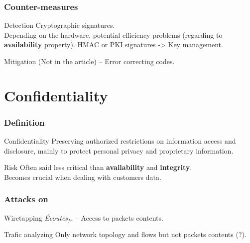 \documentclass{beamer}
\begin{document}
\begin{frame}
    \frametitle{Counter-measures}

    \begin{block}{Detection}
        Cryptographic signatures.\\
        \medskip
        Depending on the hardware, potential efficiency problems (regarding to {\bf availability} property).
        HMAC or PKI signatures -> Key management.
    \end{block}
    \vfill
    \begin{block}{Mitigation}
        (Not in the article) -- Error correcting codes.
    \end{block}
\end{frame}

\section{Confidentiality}

\begin{frame}
    \tableofcontents[currentsection]
\end{frame}

\begin{frame}
    \frametitle{Definition}

    \begin{block}{Confidentiality}
         Preserving authorized restrictions on information access and disclosure, mainly to protect personal privacy and proprietary information.
    \end{block}
    \vfill
    \begin{block}{Risk}
        Often said less critical than {\bf availability} and {\bf integrity}.\\
        \medskip
        Becomes crucial when dealing with customers data.
    \end{block}
\end{frame}

\begin{frame}
    \frametitle{Attacks on }

    \begin{block}{Wiretapping}
        {\em \'Ecoutes}$_{fr}$ -- Access to packets contents.
    \end{block}
    \vfill
    \begin{block}{Trafic analyzing}
        Only network topology and flows but not packets contents (?).
    \end{block}
\end{frame}
\end{document}
